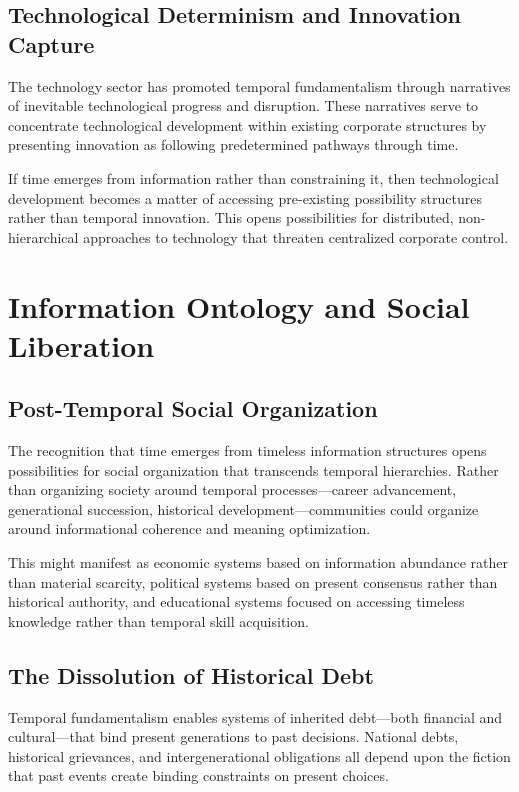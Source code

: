 \documentclass[12pt]{article}
\begin{document}
\subsection{Technological Determinism and Innovation Capture}

The technology sector has promoted temporal fundamentalism through narratives of inevitable technological progress and disruption. These narratives serve to concentrate technological development within existing corporate structures by presenting innovation as following predetermined pathways through time.

If time emerges from information rather than constraining it, then technological development becomes a matter of accessing pre-existing possibility structures rather than temporal innovation. This opens possibilities for distributed, non-hierarchical approaches to technology that threaten centralized corporate control.

\section{Information Ontology and Social Liberation}

\subsection{Post-Temporal Social Organization}

The recognition that time emerges from timeless information structures opens possibilities for social organization that transcends temporal hierarchies. Rather than organizing society around temporal processes—career advancement, generational succession, historical development—communities could organize around informational coherence and meaning optimization.

This might manifest as economic systems based on information abundance rather than material scarcity, political systems based on present consensus rather than historical authority, and educational systems focused on accessing timeless knowledge rather than temporal skill acquisition.

\subsection{The Dissolution of Historical Debt}

Temporal fundamentalism enables systems of inherited debt—both financial and cultural—that bind present generations to past decisions. National debts, historical grievances, and intergenerational obligations all depend upon the fiction that past events create binding constraints on present choices.
\end{document}
